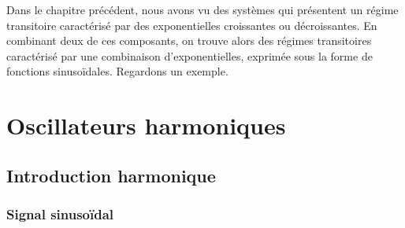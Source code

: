 \documentclass[../../main/main.tex]{subfiles}
\begin{document}
\newpage

Dans le chapitre précédent, nous avons vu des systèmes qui présentent un régime
transitoire caractérisé par des exponentielles croissantes ou décroissantes. En
combinant deux de ces composants, on trouve alors des régimes transitoires
caractérisé par une combinaison d'exponentielles, exprimée sous la forme de
fonctions sinusoïdales. Regardons un exemple.

\section{Oscillateurs harmoniques}
\subsection{Introduction harmonique}

\subsubsection{Signal sinusoïdal}
\end{document}
